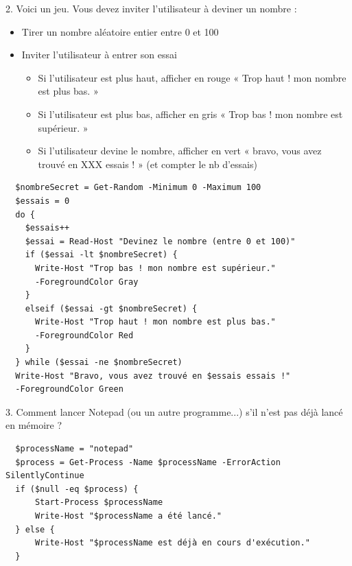 2. Voici un jeu.
Vous devez inviter l'utilisateur à deviner un nombre :
\begin{itemize}
  \item Tirer un nombre aléatoire entier entre 0 et 100
  \item Inviter l'utilisateur à entrer son essai
  \begin{itemize}
    \item Si l'utilisateur est plus haut, afficher en rouge « Trop haut ! mon nombre est plus bas. »
    \item Si l'utilisateur est plus bas, afficher en gris « Trop bas ! mon nombre est supérieur. »
    \item Si l'utilisateur devine le nombre, afficher en vert « bravo, vous avez trouvé en XXX essais ! » (et compter le nb d'essais)
  \end{itemize}
\end{itemize}

\begin{center}
  \begin{verbatim}
  $nombreSecret = Get-Random -Minimum 0 -Maximum 100
  $essais = 0
  do {
    $essais++
    $essai = Read-Host "Devinez le nombre (entre 0 et 100)"
    if ($essai -lt $nombreSecret) {
      Write-Host "Trop bas ! mon nombre est supérieur."
      -ForegroundColor Gray
    }
    elseif ($essai -gt $nombreSecret) {
      Write-Host "Trop haut ! mon nombre est plus bas."
      -ForegroundColor Red
    }
  } while ($essai -ne $nombreSecret)
  Write-Host "Bravo, vous avez trouvé en $essais essais !"
  -ForegroundColor Green
  \end{verbatim}
\end{center}


\vspace{0.5cm}

3. Comment lancer Notepad (ou un autre programme...) s'il n'est pas déjà lancé en mémoire ?

\begin{center}
  \begin{verbatim}
  $processName = "notepad"
  $process = Get-Process -Name $processName -ErrorAction SilentlyContinue
  if ($null -eq $process) {
      Start-Process $processName
      Write-Host "$processName a été lancé."
  } else {
      Write-Host "$processName est déjà en cours d'exécution."
  }
  \end{verbatim}
\end{center}

\vspace{0.5cm}

